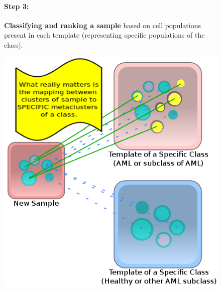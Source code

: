 \documentclass[landscape]{sciposter}
\begin{document}
\begin{multicols}{5}
\begin{figure}[t!h]
\begin{minipage}[b]{\linewidth}
\paragraph*{Step 3:} \textbf{Classifying and ranking a sample} based on cell populations present in each template (representing specific
populations of the class).
\end{minipage}
\begin{minipage} [b]{\linewidth}
\centering
\includegraphics[width=0.85\linewidth]{images/classification.png}
\end{minipage} \hfill
\end{figure}



\end{multicols}
\end{document}
